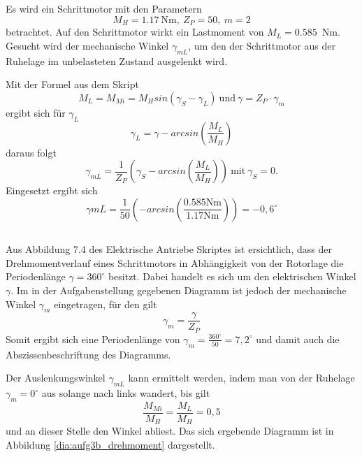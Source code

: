 \chapter{}\label{ex:aufg3}

\section{}\label{sec:aufg3a}
%
Es wird ein Schrittmotor mit den Parametern
\begin{equation}
	M_H = 1.17~\mathrm{Nm},~Z_P = 50\mathrm{,	}~m = 2
\end{equation}
betrachtet. Auf den Schrittmotor wirkt ein Lastmoment von $M_L = 0.585$~Nm. Gesucht wird der mechanische Winkel $\gamma_{mL}$, um den der Schrittmotor aus der Ruhelage im unbelasteten Zustand ausgelenkt wird.

Mit der Formel aus dem Skript
\begin{equation}
	M_L = M_{Mi} = M_H sin(\gamma_S - \gamma_L) ~\mathrm{und}~ \gamma = Z_P \cdot \gamma_m
\end{equation}
ergibt sich für $\gamma_L$
\begin{equation}
	\gamma_L = \gamma - arcsin (\frac{M_L}{M_H})
\end{equation}
daraus folgt
\begin{equation}
	\gamma_{mL} = \frac{1}{Z_P}(\gamma_S - arcsin(\frac{M_L}{M_H}))~\mathrm{mit}~ \gamma_S = 0\mathrm{.}
\end{equation}
Eingesetzt ergibt sich
\begin{equation}
	\gamma{mL} = \frac{1}{50}(-arcsin(\frac{0.585\mathrm{Nm}}{1.17\mathrm{Nm}})) =-0,6^\circ
\end{equation}


%
\section{}\label{sec:aufg3b}
Aus Abbildung 7.4 des Elektrische Antriebe Skriptes ist ersichtlich, dass der Drehmomentverlauf eines Schrittmotors in Abhängigkeit von der Rotorlage die Periodenlänge $\gamma = 360^\circ$ besitzt. Dabei handelt es sich um den elektrischen Winkel $\gamma$. Im in der Aufgabenstellung gegebenen Diagramm ist jedoch der mechanische Winkel $\gamma_m$ eingetragen, für den gilt
\begin{equation}
    \gamma_m = \frac{\gamma}{Z_P}
\end{equation}
Somit ergibt sich eine Periodenlänge von $\gamma_m = \frac{360^\circ}{50} = 7,2^\circ$ und damit auch die Abszissenbeschriftung des Diagramms.

Der Auslenkungswinkel $\gamma_{mL}$ kann ermittelt werden, indem man von der Ruhelage $\gamma_m = 0^\circ$ aus solange nach links wandert, bis gilt
\begin{equation}
    \frac{M_{Mi}}{M_H} = \frac{M_L}{M_H} = 0,5
\end{equation}
und an dieser Stelle den Winkel abliest.
Das sich ergebende Diagramm ist in Abbildung \ref{dia:aufg3b_drehmoment} dargestellt.




\clearpage